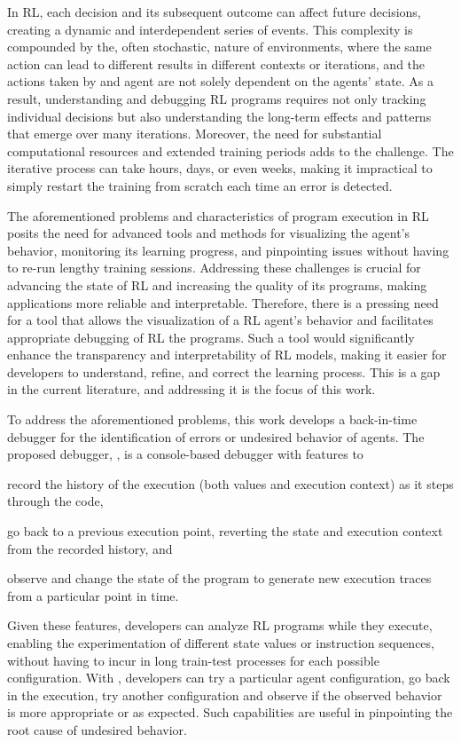 In \ac{RL}, each decision and its subsequent outcome can affect future decisions, 
creating a dynamic and interdependent series of events. This complexity is 
compounded by the, often stochastic, nature of environments, where the same action 
can lead to different results in different contexts or iterations, and the actions taken by and agent 
are not solely dependent on the agents' state. As a result, 
understanding and debugging \ac{RL} programs requires not only tracking individual 
decisions but also understanding the long-term effects and patterns that emerge 
over many iterations.
Moreover, the need for substantial computational resources and extended training 
periods adds to the challenge. The iterative process can take hours, days, or 
even weeks, making it impractical to simply restart the training from scratch 
each time an error is detected.

The aforementioned problems and characteristics of program execution in \ac{RL} posits the need 
for advanced tools and methods for visualizing the agent's behavior, monitoring its learning 
progress, and pinpointing issues without having to re-run lengthy training sessions.
Addressing these challenges is crucial for advancing the state of \ac{RL} and increasing the quality 
of its programs, making applications more reliable and interpretable.
Therefore, there is a pressing need for a tool that allows the visualization 
of a \ac{RL} agent's behavior and facilitates appropriate debugging of \ac{RL} the programs. 
Such a tool would significantly enhance the transparency and interpretability 
of \ac{RL} models, making it easier for developers to understand, refine, and correct 
the learning process. This is a gap in the current literature, and addressing it 
is the focus of this work.

To address the aforementioned problems, this work develops a back-in-time debugger for the 
identification of errors or undesired behavior of agents. The proposed debugger, \flik, is a 
console-based debugger with features to 
\begin{enumerate*}[label=(\arabic*)]
\item record the history of the execution (both values and execution context) as it steps through the 
code,
\item go back to a previous execution point, reverting the state and execution context from the 
recorded history, and 
\item observe and change the state of the program to generate new execution traces from a particular 
point in time.
\end{enumerate*}
Given these features, developers can analyze \ac{RL} programs while they execute, enabling the 
experimentation of different state values or instruction sequences, without having to incur in long 
train-test processes for each possible configuration. With \flik, developers can try a particular agent 
configuration, go back in the execution, try another configuration and observe if the observed 
behavior is more appropriate or as expected. Such capabilities are useful in pinpointing the root 
cause of undesired behavior. 

